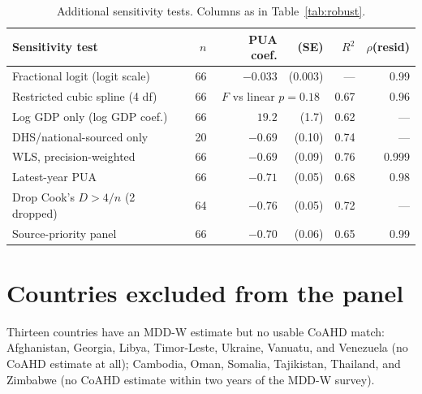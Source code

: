 \documentclass[11pt]{article}
\begin{document}
\begin{table}[htbp]
\centering\small
\caption{Additional sensitivity tests. Columns as in Table~\ref{tab:robust}.}
\label{tab:sensx}
\begin{tabular}{lrrrrr}
\toprule
Sensitivity test & $n$ & PUA coef. & (SE) & $R^2$ & $\rho$(resid)\\
\midrule
Fractional logit (logit scale) & 66 & $-0.033$ & (0.003) & --- & 0.99\\
Restricted cubic spline (4 df) & 66 & \multicolumn{2}{c}{$F$ vs linear $p=0.18$} & 0.67 & 0.96\\
Log GDP only (log GDP coef.) & 66 & $19.2$ & (1.7) & 0.62 & ---\\
DHS/national-sourced only & 20 & $-0.69$ & (0.10) & 0.74 & ---\\
WLS, precision-weighted & 66 & $-0.69$ & (0.09) & 0.76 & 0.999\\
Latest-year PUA & 66 & $-0.71$ & (0.05) & 0.68 & 0.98\\
Drop Cook's $D>4/n$ (2 dropped) & 64 & $-0.76$ & (0.05) & 0.72 & ---\\
Source-priority panel & 66 & $-0.70$ & (0.06) & 0.65 & 0.99\\
\bottomrule
\end{tabular}
\end{table}

\section{Countries excluded from the panel}\label{app:dropped}

Thirteen countries have an MDD-W estimate but no usable CoAHD match: Afghanistan, Georgia, Libya, Timor-Leste, Ukraine, Vanuatu, and Venezuela (no CoAHD estimate at all); Cambodia, Oman, Somalia, Tajikistan, Thailand, and Zimbabwe (no CoAHD estimate within two years of the MDD-W survey).
\end{document}
